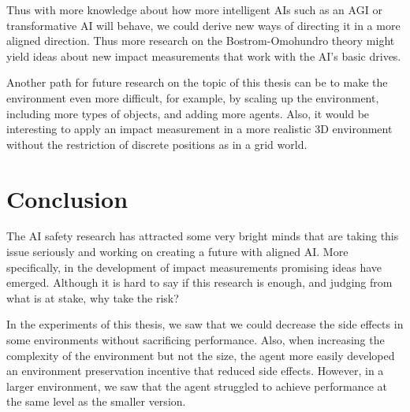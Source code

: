 \documentclass[12pt,A4]{report}
\theoremstyle{definition}
\begin{document}

Thus with more knowledge about how more intelligent AIs such as an AGI or transformative AI will behave, we could derive new ways of directing it in a more aligned direction. Thus more research on the Bostrom-Omohundro theory might yield ideas about new impact measurements that work with the AI's basic drives.

Another path for future research on the topic of this thesis can be to make the environment even more difficult, for example, by scaling up the environment, including more types of objects, and adding more agents. Also, it would be interesting to apply an impact measurement in a more realistic 3D environment without the restriction of discrete positions as in a grid world. 

\section{Conclusion}
The AI safety research has attracted some very bright minds that are taking this issue seriously and working on creating a future with aligned AI. More specifically, in the development of impact measurements promising ideas have emerged. Although it is hard to say if this research is enough, and judging from what is at stake, why take the risk?

In the experiments of this thesis, we saw that we could decrease the side effects in some environments without sacrificing performance. Also, when increasing the complexity of the environment but not the size, the agent more easily developed an environment preservation incentive that reduced side effects. However, in a larger environment, we saw that the agent struggled to achieve performance at the same level as the smaller version.











\end{document}
